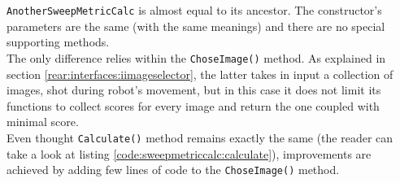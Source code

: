 \texttt{AnotherSweepMetricCalc} is almost equal to its ancestor. The
constructor's parameters are the same (with the same meanings)
and there are no special supporting methods.
\\
The only difference relies within the \texttt{ChoseImage()} method. As
explained in section \ref{rear:interfaces:iimageselector}, the latter
takes in input a collection of images, shot during robot's movement,
but in this case it does not limit its functions to collect scores
for every image and return the one coupled with minimal score. 
\\
Even thought \texttt{Calculate()} method remains exactly the same
(the reader can take a look at listing
\ref{code:sweepmetriccalc:calculate}), improvements are
achieved by adding few lines of code to the \texttt{ChoseImage()}
method.
\\
